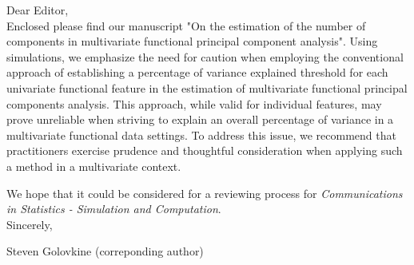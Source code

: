 \documentclass{article}
\date{\today}
\begin{document}
Dear Editor,
\\

Enclosed please find our manuscript "On the estimation of the number of components in multivariate functional principal component analysis". Using simulations, we emphasize the need for caution when employing the conventional approach of establishing a percentage of variance explained threshold for each univariate functional feature in the estimation of multivariate functional principal components analysis. This approach, while valid for individual features, may prove unreliable when striving to explain an overall percentage of variance in a multivariate functional data settings. To address this issue, we recommend that practitioners exercise prudence and thoughtful consideration when applying such a method in a multivariate context.


We hope that it could be considered for a reviewing process for \emph{Communications in Statistics - Simulation and Computation}.
\\

Sincerely,

Steven Golovkine (correponding author)
\end{document}
